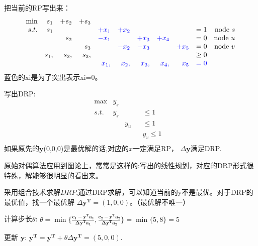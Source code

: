\documentclass[11pt]{article}
\begin{document}
\begin{CJK}{UTF8}{gbsn}
把当前的RP写出来：
\[
\begin{array}{rrrrrrrrrrrrrrrrrl}
 \min & s_1 &+s_2 & +s_3 &     &        &    &     &   & \\
 s.t. & s_1 &     &     & \textcolor{blue}{+x_1}  & \textcolor{blue}{+x_2} &    &     &   & = 1    & \text{node }s  \\
     &      &s_2     &             &  \textcolor{blue}{-x_1}  &     & \textcolor{blue}{+x_3}  &  \textcolor{blue}{+x_4}     &  & =  0  & \text{node }u\\
     &      &          & s_3       &     & \textcolor{blue}{-x_2}    & \textcolor{blue}{-x_3}  &      & \textcolor{blue}{+x_5} & =  0 & \text{node }v \\
     & s_1, &s_2, &s_3,  &      &          &         &         &     & \geq 0 \\
     &         &       &         &  \textcolor{blue}{x_1,} &    \textcolor{blue}{ x_2,} &    \textcolor{blue}{x_3,} &   \textcolor{blue}{x_4,} & \textcolor{blue}{x_5} & \textcolor{blue}{= 0} \\ 	
\end{array} \nonumber
\]
蓝色的xi是为了突出表示xi=0。

写出DRP:
\[
\begin{array}{rrrrrrrrrl}
 \max & y_s &      & &            &\\
s.t. & y_s  &      & &     \leq 1 &  \\
     &      & y_u  & &     \leq 1 &  \\
     &      &      & & y_v \leq 1 &  \\
\end{array} \nonumber
\]
如果原先的$\mathbf{y}$(0,0,0)是最优解的话,对应的$x$一定满足RP， $\Delta \mathbf{y}$满足DRP.

原始对偶算法应用到图论上，常常是这样的:写出的线性规划，对应的DRP形式很特殊，解能够很明显的看出来。

采用组合技术求解$DRP$,通过DRP求解，可以知道当前的y不是最优。对于DRP的最优值，找一个最优解 $\Delta \mathbf{y^T} = (1, 0, 0)$。（最优解不唯一）

计算步长$\theta$: $\theta = \min \{ \frac{ \mathbf{c_1 - y^Ta_1} }{ \mathbf{\Delta y^T a_1}  }, \frac{ \mathbf{c_2 - y^Ta_2} }{ \mathbf{\Delta y^T a_2}  }  \} = \min\{ 5, 8\} = 5$

更新 $\mathbf{y}$: $\mathbf{y^T=y^T}+\theta \Delta \mathbf{y^T}  = (5, 0, 0)$.


\end{CJK}
\end{document}

